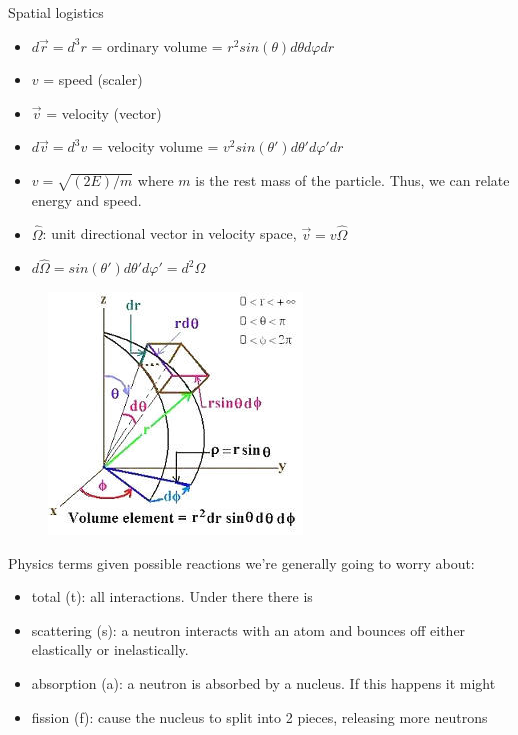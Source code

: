 \documentclass[12pt]{article}
\newcommand{\vOmega}{\ensuremath{\hat{\Omega}}}
\begin{document}
Spatial logistics
\begin{itemize}
\item $d\vec{r} = d^3r$ = ordinary volume = $r^2 sin(\theta) d\theta d\varphi dr$
%
\item $v$ = speed (scaler)
\item $\vec{v}$ = velocity (vector)
\item $d\vec{v} = d^3v$ = velocity volume = $v^2 sin(\theta')d\theta' d\varphi' dr$
\item $v = \sqrt{(2E)/m}$ where $m$ is the rest mass of the particle. Thus, we can relate energy and speed.

\item $\vOmega$: unit directional vector in velocity space, $\vec{v} = v\vOmega$
\item $d\vOmega = sin(\theta')d\theta' d\varphi' =  d^2\Omega$
\end{itemize}

\begin{figure}[h!]
\begin{center}
\includegraphics[height=2 in]{VolumeElement}
\end{center}
\end{figure}

Physics terms given possible reactions we're generally going to worry about:
\begin{itemize}
\item total (t): all interactions. Under there there is 
\item scattering (s): a neutron interacts with an atom and bounces off either elastically or inelastically.
\item absorption (a): a neutron is absorbed by a nucleus. If this happens it might
\item fission (f): cause the nucleus to split into 2 pieces, releasing more neutrons
\end{itemize}
\end{document}

